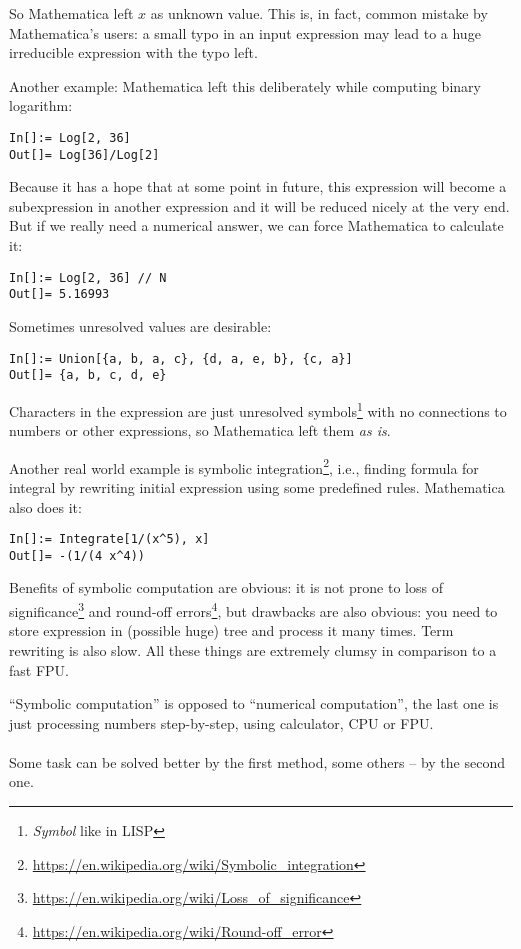 So Mathematica left $x$ as unknown value.
This is, in fact, common mistake by Mathematica's users: a small typo in an input expression may lead to a huge irreducible expression with the typo left.

Another example: Mathematica left this deliberately while computing binary logarithm:

\begin{lstlisting}
In[]:= Log[2, 36]
Out[]= Log[36]/Log[2]
\end{lstlisting}

Because it has a hope that at some point in future, this expression will become a subexpression in another expression and 
it will be reduced nicely at the very end.
But if we really need a numerical answer, we can force Mathematica to calculate it:

\begin{lstlisting}
In[]:= Log[2, 36] // N
Out[]= 5.16993
\end{lstlisting}

Sometimes unresolved values are desirable:

\begin{lstlisting}
In[]:= Union[{a, b, a, c}, {d, a, e, b}, {c, a}]
Out[]= {a, b, c, d, e}
\end{lstlisting}

Characters in the expression are just unresolved symbols\footnote{\textit{Symbol} like in LISP} with no connections to numbers or other expressions, 
so Mathematica left them \textit{as is}.

Another real world example is symbolic integration\footnote{\url{https://en.wikipedia.org/wiki/Symbolic_integration}}, 
i.e., finding formula for integral by rewriting initial expression using some predefined rules.
Mathematica also does it:

\begin{lstlisting}
In[]:= Integrate[1/(x^5), x]
Out[]= -(1/(4 x^4))
\end{lstlisting}

Benefits of symbolic computation are obvious: it is not prone to loss of significance\footnote{\url{https://en.wikipedia.org/wiki/Loss_of_significance}} and 
round-off errors\footnote{\url{https://en.wikipedia.org/wiki/Round-off_error}}, but drawbacks are also obvious: you need to store expression in (possible huge) tree
and process it many times.
Term rewriting is also slow.
All these things are extremely clumsy in comparison to a fast \ac{FPU}.

``Symbolic computation'' is opposed to ``numerical computation'', the last one is just processing numbers step-by-step, using calculator, \ac{CPU} or \ac{FPU}.\\
\\
Some task can be solved better by the first method, some others -- by the second one.

